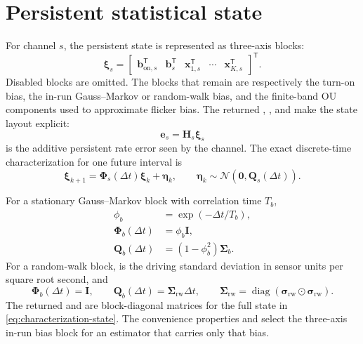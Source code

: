 \documentclass[11pt,oneside,headings=big]{scrreprt}
\newcommand{\Normal}{\mathcal{N}}
\newcommand{\diag}{\operatorname{diag}}
\newcommand{\Had}{\odot}
\newcommand{\vect}[1]{\bm{#1}}
\newcommand{\mat}[1]{\bm{#1}}
\begin{document}
    \section{Persistent statistical state}
    For channel \(s\), the persistent state is represented as three-axis blocks:
    \begin{equation}
        \boldsymbol\xi_s=
        \begin{bmatrix}
            \vect b_{\mathrm{on},s}^{\mathsf T} &
            \vect b_s^{\mathsf T} &
            \vect x_{1,s}^{\mathsf T} &\cdots&
            \vect x_{K,s}^{\mathsf T}
        \end{bmatrix}^{\mathsf T}.
        \label{eq:characterization-state}
    \end{equation}
    Disabled blocks are omitted. The blocks that remain are respectively the
    turn-on bias, the in-run Gauss--Markov or random-walk bias, and the finite-band
    OU components used to approximate flicker bias. The returned
    , , and
     make the state layout explicit:
    \begin{equation}
        \vect e_s=\mat H_s\boldsymbol\xi_s
    \end{equation}
    is the additive persistent rate error seen by the channel. The exact
    discrete-time characterization for one future interval is
    \begin{equation}
        \boldsymbol\xi_{k+1}
        =\mat\Phi_s(\Delta t)\boldsymbol\xi_k+\vect\eta_k,
        \qquad
        \vect\eta_k\sim\Normal(\vect0,\mat Q_s(\Delta t)).
        \label{eq:characterization-discrete-state}
    \end{equation}

    For a stationary Gauss--Markov block with correlation time \(T_b\),
    \begin{align}
        \phi_b&=\exp(-\Delta t/T_b),\\
        \mat\Phi_b(\Delta t)&=\phi_b\mat I,\\
        \mat Q_b(\Delta t)&=(1-\phi_b^2)\mat \Sigma_b.
        \label{eq:characterization-gm}
    \end{align}
    For a random-walk block,  is the driving standard
    deviation in sensor units per square root second, and
    \begin{equation}
        \mat\Phi_b(\Delta t)=\mat I,
        \qquad
        \mat Q_b(\Delta t)=\mat \Sigma_{\mathrm{rw}}\Delta t,
        \qquad \mat \Sigma_{\mathrm{rw}}=\diag(\vect\sigma_{\mathrm{rw}}\Had\vect\sigma_{\mathrm{rw}}).
        \label{eq:characterization-rw}
    \end{equation}
    The returned  and
     are block-diagonal matrices for the
    full state in \cref{eq:characterization-state}. The convenience properties
     and  select the
    three-axis in-run bias block for an estimator that carries only that bias.
\end{document}

